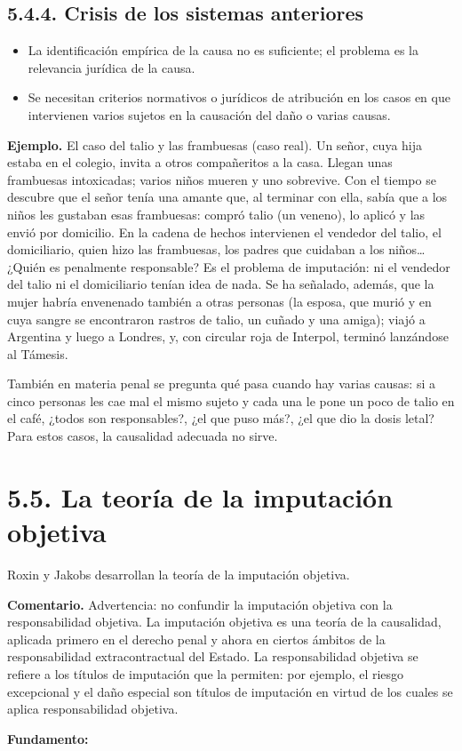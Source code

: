 \subsection{5.4.4. Crisis de los sistemas anteriores}
\begin{itemize}
\item La identificación empírica de la causa no es suficiente; el problema es la relevancia jurídica de la causa.
\item Se necesitan criterios normativos o jurídicos de atribución en los casos en que intervienen varios sujetos en la causación del daño o varias causas.
\end{itemize}
\begin{ejemplo}
\textcolor[HTML]{4F6228}{\textbf{Ejemplo. }}El caso del talio y las frambuesas (caso real). Un señor, cuya hija estaba en el colegio, invita a otros compañeritos a la casa. Llegan unas frambuesas intoxicadas; varios niños mueren y uno sobrevive. Con el tiempo se descubre que el señor tenía una amante que, al terminar con ella, sabía que a los niños les gustaban esas frambuesas: compró talio (un veneno), lo aplicó y las envió por domicilio. En la cadena de hechos intervienen el vendedor del talio, el domiciliario, quien hizo las frambuesas, los padres que cuidaban a los niños… ¿Quién es penalmente responsable? Es el problema de imputación: ni el vendedor del talio ni el domiciliario tenían idea de nada. Se ha señalado, además, que la mujer habría envenenado también a otras personas (la esposa, que murió y en cuya sangre se encontraron rastros de talio, un cuñado y una amiga); viajó a Argentina y luego a Londres, y, con circular roja de Interpol, terminó lanzándose al Támesis.
\end{ejemplo}
También en materia penal se pregunta qué pasa cuando hay varias causas: si a cinco personas les cae mal el mismo sujeto y cada una le pone un poco de talio en el café, ¿todos son responsables?, ¿el que puso más?, ¿el que dio la dosis letal? Para estos casos, la causalidad adecuada no sirve.

\section{5.5. La teoría de la imputación objetiva}
Roxin y Jakobs desarrollan la teoría de la imputación objetiva.

\begin{comentario}
\textcolor[HTML]{8A6D3B}{\textbf{Comentario. }}Advertencia: no confundir la imputación objetiva con la responsabilidad objetiva. La imputación objetiva es una teoría de la causalidad, aplicada primero en el derecho penal y ahora en ciertos ámbitos de la responsabilidad extracontractual del Estado. La responsabilidad objetiva se refiere a los títulos de imputación que la permiten: por ejemplo, el riesgo excepcional y el daño especial son títulos de imputación en virtud de los cuales se aplica responsabilidad objetiva.
\end{comentario}
\textbf{Fundamento:}

